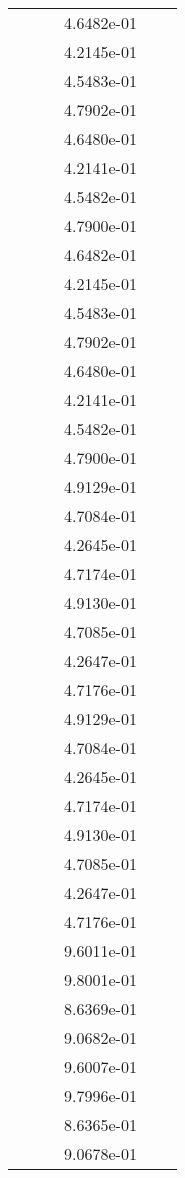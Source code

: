 \begin{xltabular}{\textwidth}{r|rS[table-format=1.3e+2]S[table-format=1.4e+2]S[table-format=1.4e+2]S[table-format=-1.5]}
&  &  & 4.6482e-01 & & \\
&  &  & 4.2145e-01 & & \\
&  &  & 4.5483e-01 & & \\
&  &  & 4.7902e-01 & & \\
&  &  & 4.6480e-01 & & \\
&  &  & 4.2141e-01 & & \\
&  &  & 4.5482e-01 & & \\
&  &  & 4.7900e-01 & & \\
&  &  & 4.6482e-01 & & \\
&  &  & 4.2145e-01 & & \\
&  &  & 4.5483e-01 & & \\
&  &  & 4.7902e-01 & & \\
&  &  & 4.6480e-01 & & \\
&  &  & 4.2141e-01 & & \\
&  &  & 4.5482e-01 & & \\
&  &  & 4.7900e-01 & & \\
&  &  & 4.9129e-01 & & \\
&  &  & 4.7084e-01 & & \\
&  &  & 4.2645e-01 & & \\
&  &  & 4.7174e-01 & & \\
&  &  & 4.9130e-01 & & \\
&  &  & 4.7085e-01 & & \\
&  &  & 4.2647e-01 & & \\
&  &  & 4.7176e-01 & & \\
&  &  & 4.9129e-01 & & \\
&  &  & 4.7084e-01 & & \\
&  &  & 4.2645e-01 & & \\
&  &  & 4.7174e-01 & & \\
&  &  & 4.9130e-01 & & \\
&  &  & 4.7085e-01 & & \\
&  &  & 4.2647e-01 & & \\
&  &  & 4.7176e-01 & & \\
&  &  & 9.6011e-01 & & \\
&  &  & 9.8001e-01 & & \\
&  &  & 8.6369e-01 & & \\
&  &  & 9.0682e-01 & & \\
&  &  & 9.6007e-01 & & \\
&  &  & 9.7996e-01 & & \\
&  &  & 8.6365e-01 & & \\
&  &  & 9.0678e-01 & & \\

\end{xltabular}

